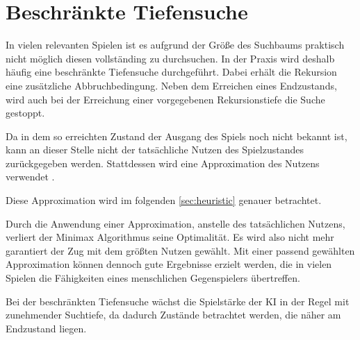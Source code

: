 \section{Beschränkte Tiefensuche}

In vielen relevanten Spielen ist es aufgrund der Größe des Suchbaums praktisch nicht möglich diesen vollständing zu
durchsuchen. In der Praxis wird deshalb häufig eine beschränkte Tiefensuche durchgeführt. Dabei erhält die Rekursion
eine zusätzliche Abbruchbedingung. Neben dem Erreichen eines Endzustands, wird auch bei der Erreichung einer
vorgegebenen Rekursionstiefe die Suche gestoppt.

Da in dem so erreichten Zustand der Ausgang des Spiels noch nicht bekannt ist, kann an dieser Stelle nicht der
tatsächliche Nutzen des Spielzustandes zurückgegeben werden. Stattdessen wird eine Approximation des Nutzens verwendet \cite[S.~171]{ai2010russel}.

Diese Approximation wird im folgenden \autoref{sec:heuristic} genauer betrachtet.

Durch die Anwendung einer Approximation, anstelle des tatsächlichen Nutzens, verliert der Minimax Algorithmus seine Optimalität. Es
wird also nicht mehr garantiert der Zug mit dem größten Nutzen gewählt. Mit einer passend gewählten Approximation
können dennoch gute Ergebnisse erzielt werden, die in vielen Spielen die Fähigkeiten eines menschlichen Gegenspielers
übertreffen.

Bei der beschränkten Tiefensuche wächst die Spielstärke der KI in der Regel mit zunehmender Suchtiefe, da dadurch Zustände
betrachtet werden, die näher am Endzustand liegen.
